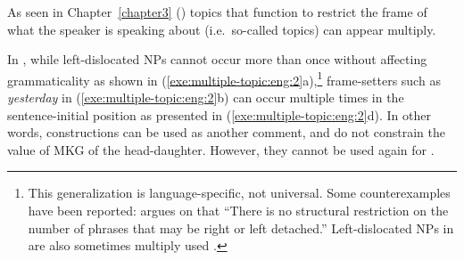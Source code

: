 

\noindent As seen in Chapter~\ref{chapter3}
() topics that function to restrict the
frame of what the speaker is speaking about (i.e.\ so-called
 topics) can appear multiply.

In , while left-dislocated NPs cannot occur more than
once without affecting grammaticality as shown in
(\ref{exe:multiple-topic:eng:2}a),\footnote{This generalization is
  language-specific, not universal.  Some counterexamples have been
  reported: \citet[p.\ 123]{vallduvi:93} argues on  that
  ``There is no structural restriction on the number of phrases that
  may be right or left detached.''  Left-dislocated NPs in
   are also sometimes multiply used
  \citep[p.\ 224]{zagona:02}.}  frame-setters such as
\textit{yesterday} in (\ref{exe:multiple-topic:eng:2}b) can occur
multiple times in the sentence-initial position as presented in
(\ref{exe:multiple-topic:eng:2}d). In other words,
 constructions can be used as another comment, and
do not constrain the value of MKG of the head-daughter.
However, they cannot be used again for .

 



